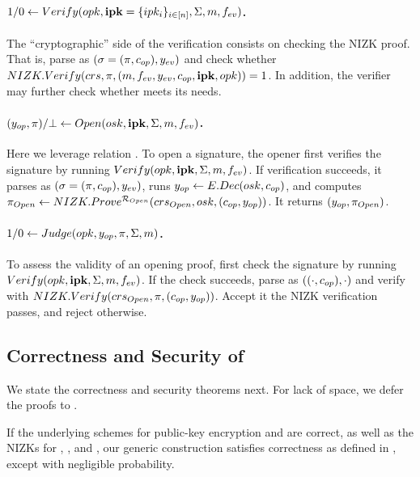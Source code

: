 \paragraph{$1/0 \gets Verify(opk,\mathbf{ipk}=\lbrace ipk_i\rbrace_{i\in[n]},
  \Sigma,m,f_{ev})$.} %
The ``cryptographic'' side of the verification consists on checking
the NIZK proof. That is, parse \Sig as $(\sigma = (\pi,c_{op}),y_{ev})$ and
check whether $NIZK.Verify(crs,\pi,(m,f_{ev},y_{ev},
c_{op},\mathbf{ipk},opk)) = 1$. In addition, the verifier may further check
whether \yeval meets its needs.

\paragraph{$(y_{op},\pi)/\bot \gets
  Open(osk,\mathbf{ipk},\Sigma,m,f_{ev})$.} %
Here we leverage relation \RelIns.
%
To open a signature, the opener first verifies the signature by running $Verify
(opk,\mathbf{ipk}, \Sigma,m,f_{ev})$. If verification succeeds, it parses
\Sig as $(\sigma=(\pi,c_{op}),y_{ev})$, runs $y_{op}
\gets E.Dec(osk,c_{op})$, and computes $\pi_{Open} \gets
NIZK.Prove^{\mathcal{R}_{Open}}(crs_{Open},osk,(c_{op},y_{op}))$. It
returns $(y_{op},\pi_{Open})$.

\paragraph{$1/0 \gets Judge(opk,y_{op},\pi,\Sigma,m)$.} %
To assess the validity of an opening proof, first check the signature
by running $Verify(opk,\mathbf{ipk},\Sigma,m,f_{ev})$. If the check succeeds,
parse \Sig as $((\cdot,c_{op}),\cdot)$ and verify \NIZKproof with
$NIZK.Verify(crs_{Open},\pi,(c_{op},y_{op}))$. Accept it the NIZK
verification passes, and reject otherwise.

\subsection{Correctness and Security of \CUASGen}
\label{ssec:security-uas}

We state the correctness and security theorems next. For lack of space, we defer
the proofs to .

\begin{theorem}
  \label{thm:correctness-uas}
  If the underlying schemes for public-key encryption and \SBCM are correct, as
  well as the NIZKs for \RelIss, \RelSig,
  and \RelIns, our generic construction \CUASGen satisfies
  correctness as defined in , except with negligible
  probability.
\end{theorem}

